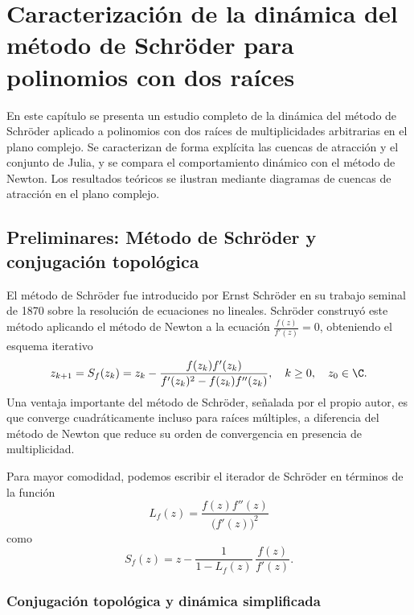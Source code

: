 \chapter{Caracterización de la dinámica del método de Schröder para polinomios con dos raíces}
\label{cap:dinamica_schroder}

En este capítulo se presenta un estudio completo de la dinámica del método de Schröder aplicado a polinomios con dos raíces de multiplicidades arbitrarias en el plano complejo. Se caracterizan de forma explícita las cuencas de atracción y el conjunto de Julia, y se compara el comportamiento dinámico con el método de Newton. Los resultados teóricos se ilustran mediante diagramas de cuencas de atracción en el plano complejo.

\section{Preliminares: Método de Schröder y conjugación topológica}

El método de Schröder fue introducido por Ernst Schröder en su trabajo seminal de 1870 \cite{Sch} sobre la resolución de ecuaciones no lineales. Schröder construyó este método aplicando el método de Newton a la ecuación $\tfrac{f(z)}{f'(z)}=0$, obteniendo el esquema iterativo
\begin{equation}
 z_{k+1}=S_f(z_k)=z_k-\frac{f(z_k)f'(z_k)}{f'(z_k)^2-f(z_k)f''(z_k)}, \quad k\ge 0, \quad z_0\in\C.
 \label{eq:Sch_def}
\end{equation}
Una ventaja importante del método de Schröder, señalada por el propio autor, es que converge cuadráticamente incluso para raíces múltiples, a diferencia del método de Newton que reduce su orden de convergencia en presencia de multiplicidad.

Para mayor comodidad, podemos escribir el iterador de Schröder en términos de la función
\begin{equation}
 L_f(z)=\frac{f(z)f''(z)}{\big(f'(z)\big)^2}
 \label{eq:Lf_def}
\end{equation}
como
\begin{equation}
 S_f(z)=z-\frac{1}{1-L_f(z)}\,\frac{f(z)}{f'(z)}.
 \label{eq:Sch_real}
\end{equation}

\subsection{Conjugación topológica y dinámica simplificada}

